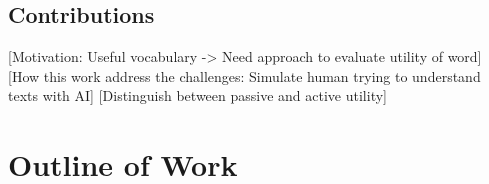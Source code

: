 \subsection{Contributions}
[Motivation: Useful vocabulary -> Need approach to evaluate utility of word]
[How this work address the challenges: Simulate human trying to understand texts with AI]
[Distinguish between passive and active utility]

\section{Outline of Work}

